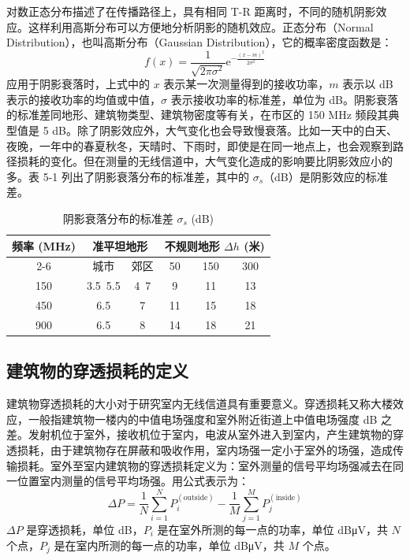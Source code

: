 \documentclass{../ElectromagneticFieldTemplate}
\begin{document}
对数正态分布描述了在传播路径上，具有相同 T-R 距离时，不同的随机阴影效应。这样利用高斯分布可以方便地分析阴影的随机效应。正态分布（Normal Distribution），也叫高斯分布（Gaussian Distribution），它的概率密度函数是：
\begin{equation}
f(x) = \frac{1}{\sqrt{2\pi\sigma^2}} \mathrm{e}^{-\frac{(x - m)^2}{2\sigma^2}} \tag{5-12}
\end{equation}
应用于阴影衰落时，上式中的 \(x\) 表示某一次测量得到的接收功率，\(m\) 表示以 dB 表示的接收功率的均值或中值，\(\sigma\) 表示接收功率的标准差，单位为 dB。阴影衰落的标准差同地形、建筑物类型、建筑物密度等有关，在市区的 150 MHz 频段其典型值是 5 dB。除了阴影效应外，大气变化也会导致慢衰落。比如一天中的白天、夜晚，一年中的春夏秋冬，天晴时、下雨时，即使是在同一地点上，也会观察到路径损耗的变化。但在测量的无线信道中，大气变化造成的影响要比阴影效应小的多。表 5-1 列出了阴影衰落分布的标准差，其中的 \(\sigma_s\)（dB）是阴影效应的标准差。

\begin{table}[h]
\centering
\caption{阴影衰落分布的标准差 \(\sigma_s\) (dB)}
\begin{tabular}{|c|c|c|c|c|c|}
\hline
\multirow{2}{*}{频率 (MHz)} & \multicolumn{2}{c|}{准平坦地形} & \multicolumn{3}{c|}{不规则地形 \(\Delta h\) (米)} \\
\cline{2-6}
& 城市 & 郊区 & 50 & 150 & 300 \\
\hline
150 & 3.5~5.5 & 4~7 & 9 & 11 & 13 \\
\hline
450 & 6.5 & 7 & 11 & 15 & 18 \\
\hline
900 & 6.5 & 8 & 14 & 18 & 21 \\
\hline
\end{tabular}
\end{table}

\subsection{建筑物的穿透损耗的定义}

建筑物穿透损耗的大小对于研究室内无线信道具有重要意义。穿透损耗又称大楼效应，一般指建筑物一楼内的中值电场强度和室外附近街道上中值电场强度 dB 之差。发射机位于室外，接收机位于室内，电波从室外进入到室内，产生建筑物的穿透损耗，由于建筑物存在屏蔽和吸收作用，室内场强一定小于室外的场强，造成传输损耗。室外至室内建筑物的穿透损耗定义为：室外测量的信号平均场强减去在同一位置室内测量的信号平均场强。用公式表示为：
\begin{equation}
\Delta P = \frac{1}{N}\sum_{i=1}^{N} P_i^{(\text{outside})} - \frac{1}{M}\sum_{j=1}^{M} P_j^{(\text{inside})} \tag{5-13}
\end{equation}
\(\Delta P\) 是穿透损耗，单位 dB，\(P_i\) 是在室外所测的每一点的功率，单位 dBμV，共 \(N\) 个点，\(P_j\) 是在室内所测的每一点的功率，单位 dBμV，共 \(M\) 个点。
\end{document}
